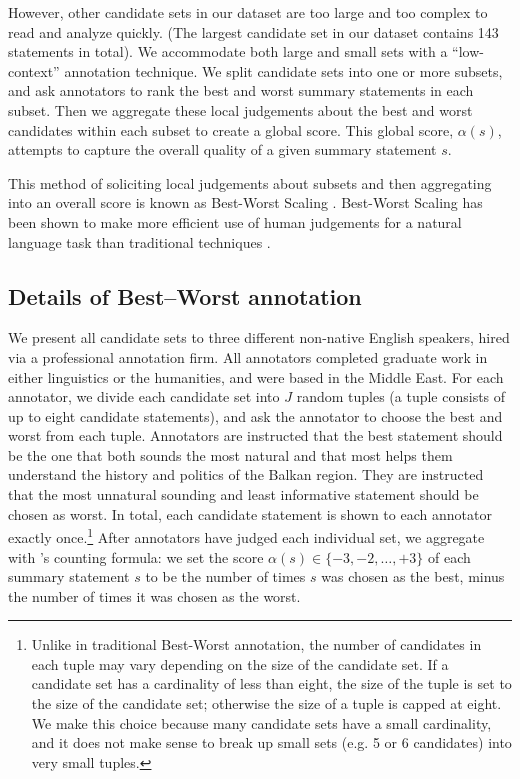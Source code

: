\documentclass[11pt,a4paper]{article}
\begin{document}
However, other candidate sets in our dataset are too large and too complex to read and analyze quickly. (The largest candidate set in our dataset contains 143 statements in total). We accommodate both large and small sets with a ``low-context'' \cite{emnlp2017conceptmaps} annotation technique. We split candidate sets into one or more subsets, and ask annotators to rank the best and worst summary statements in each subset. Then we aggregate these local judgements about the best and worst candidates within each subset to create a global score. This global score, $\alpha(s)$, attempts to capture the overall quality of a given summary statement $s$. 

This method of soliciting local judgements about subsets and then aggregating into an overall score is known as Best-Worst Scaling \cite{louviere_91}. Best-Worst Scaling has been shown to make more efficient use of human judgements for a natural language task than traditional  techniques \cite{Kiritchenko2017BestWorstSM}.

\subsection{Details of Best--Worst annotation}\label{s:details}

We present all candidate sets to three different non-native English speakers, hired via a professional annotation firm. All annotators completed graduate work in either linguistics or the humanities, and were based in the Middle East. For each annotator, we divide each candidate set into $J$ random tuples (a tuple consists of up to eight candidate statements), and ask the annotator to choose the best and worst from each tuple. Annotators are instructed that the best statement should be the one that both sounds the most natural and that most helps them understand the history and politics of the Balkan region. They are instructed that the most unnatural sounding and least informative statement should be chosen as worst. In total, each candidate statement is shown to each annotator exactly once.\footnote{Unlike in traditional Best-Worst annotation, the number of candidates in each tuple may vary depending on the size of the candidate set. If a candidate set has a cardinality of less than eight, the size of the tuple is set to the size of the candidate set; otherwise the size of a tuple is capped at eight. We make this choice because many candidate sets have a small cardinality,  and it does not make sense to break up small sets (e.g. 5 or 6 candidates) into very small tuples.} After annotators have judged each individual set, we aggregate with \citet{orme}'s counting formula:
we set the score $\alpha(s) \in \{-3,-2, \ldots, +3\}$ of each summary statement $s$ to be the number of times $s$ was chosen as the best, minus the number of times it was chosen as the worst.
\end{document}
